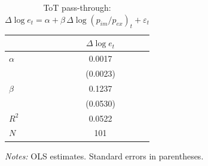 
\begin{table}[H]
    \centering
    \begin{singlespace}
    \caption{ToT pass-through: $\Delta \log e_t = \alpha + \beta \, \Delta \log (p_{im}/p_{ex})_t + \varepsilon_t$}
    \label{tab:tot_passthrough}
    \begin{tabular}{lc}
        \toprule
        & $\Delta \log e_t$ \\
        \midrule
        $\alpha$ & 0.0017 \\
                  & (0.0023) \\[4pt]
        $\beta$   & 0.1237 \\
                  & (0.0530) \\
        \midrule
        $R^2$     & 0.0522 \\
        $N$       & 101 \\
        \bottomrule
    \end{tabular}

    \smallskip
    \centering
    \begin{minipage}{0.5\linewidth}
    \footnotesize
    \textit{Notes:} OLS estimates. Standard errors in parentheses.
    \end{minipage}
    \end{singlespace}
\end{table}
